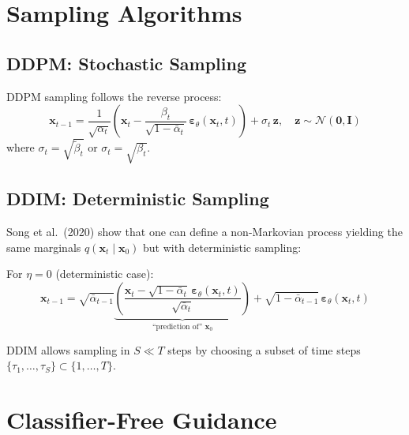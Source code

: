 \section{Sampling Algorithms}
\label{sec:sampling}

\subsection{DDPM: Stochastic Sampling}

DDPM sampling follows the reverse process:
\begin{equation}
\mathbf{x}_{t-1} = \frac{1}{\sqrt{\alpha_t}}\left(\mathbf{x}_t - \frac{\beta_t}{\sqrt{1 - \bar{\alpha}_t}}\,\boldsymbol{\varepsilon}_\theta(\mathbf{x}_t, t)\right) + \sigma_t\,\mathbf{z}, \quad \mathbf{z} \sim \mathcal{N}(\mathbf{0}, \mathbf{I})
\label{eq:ddpm-sampling}
\end{equation}
where $\sigma_t = \sqrt{\tilde{\beta}_t}$ or $\sigma_t = \sqrt{\beta_t}$.

\subsection{DDIM: Deterministic Sampling}
\label{sec:ddim}

Song et al.\ (2020) show that one can define a non-Markovian process
yielding the same marginals $q(\mathbf{x}_t \mid \mathbf{x}_0)$ but with
deterministic sampling:

\begin{theorem}
\label{thm:ddim}
For $\eta = 0$ (deterministic case):
\begin{equation}
\mathbf{x}_{t-1} = \sqrt{\bar{\alpha}_{t-1}}\underbrace{\left(\frac{\mathbf{x}_t - \sqrt{1 - \bar{\alpha}_t}\,\boldsymbol{\varepsilon}_\theta(\mathbf{x}_t, t)}{\sqrt{\bar{\alpha}_t}}\right)}_{\text{``prediction of'' } \mathbf{x}_0} + \sqrt{1 - \bar{\alpha}_{t-1}}\,\boldsymbol{\varepsilon}_\theta(\mathbf{x}_t, t)
\label{eq:ddim}
\end{equation}
\end{theorem}

\begin{remark}
DDIM allows sampling in $S \ll T$ steps by choosing a subset
of time steps $\{\tau_1, \ldots, \tau_S\} \subset \{1, \ldots, T\}$.
\end{remark}

\section{Classifier-Free Guidance}
\label{sec:cfg}

